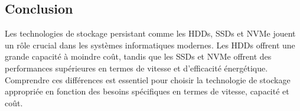 \documentclass[10pt,a4paper]{article}
\begin{document}
\subsection*{Conclusion}
Les technologies de stockage persistant comme les HDDs, SSDs et NVMe jouent un rôle crucial dans les systèmes informatiques modernes. Les HDDs offrent une grande capacité à moindre coût, tandis que les SSDs et NVMe offrent des performances supérieures en termes de vitesse et d'efficacité énergétique. Comprendre ces différences est essentiel pour choisir la technologie de stockage appropriée en fonction des besoins spécifiques en termes de vitesse, capacité et coût.
\end{document}
